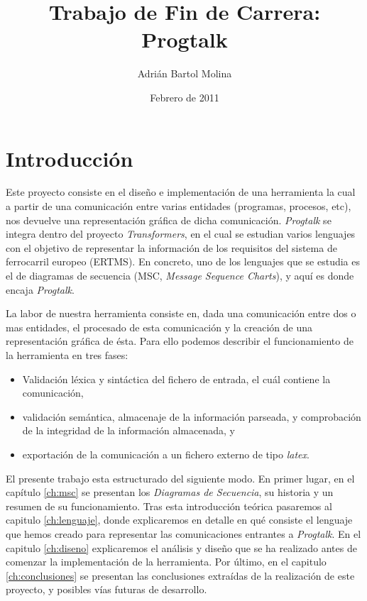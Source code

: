 \documentclass[12pt,a4paper]{report}
\title{Trabajo de Fin de Carrera: Progtalk}
\author{Adrián Bartol Molina}
\date{Febrero de 2011}
\begin{document}
\maketitle
\tableofcontents

\chapter{Introducción}

Este proyecto consiste en el diseño e implementación de una herramienta la cual a partir de una comunicación entre varias entidades (programas, procesos, etc), nos devuelve una representación gráfica de dicha comunicación. \textit{Progtalk} se integra dentro del proyecto \textit{Transformers}, en el cual se estudian varios lenguajes con el objetivo de representar la información de los requisitos del sistema de ferrocarril europeo (ERTMS). En concreto, uno de los lenguajes que se estudia es el de diagramas de secuencia (MSC, \emph{Message Sequence Charts}), y aquí es donde encaja \textit{Progtalk}. 

La labor de nuestra herramienta consiste en, dada una comunicación entre dos o mas entidades, el procesado de esta comunicación y la creación de una representación gráfica de ésta. Para ello podemos describir el funcionamiento de la herramienta en tres fases:

\begin{itemize}
\item Validación léxica y sintáctica del fichero de entrada, el cuál contiene la comunicación,
\item validación semántica, almacenaje de la información parseada, y comprobación de la integridad de la información almacenada, y
\item exportación de la comunicación a un fichero externo de tipo \textit{latex}.
\end{itemize}

El presente trabajo esta estructurado del siguiente modo. En primer lugar, en el capítulo \ref{ch:msc} se presentan los \textit{Diagramas de Secuencia}, su historia y un resumen de su funcionamiento. Tras esta introducción teórica pasaremos al capitulo \ref{ch:lenguaje}, donde explicaremos en detalle en qué consiste el lenguaje que hemos creado para representar las comunicaciones entrantes a \textit{Progtalk}. En el capitulo \ref{ch:diseno} explicaremos el análisis y diseño que se ha realizado antes de comenzar la implementación de la herramienta. Por último, en el capitulo \ref{ch:conclusiones} se presentan las conclusiones extraídas de la realización de este proyecto, y posibles vías futuras de desarrollo.
\end{document}
